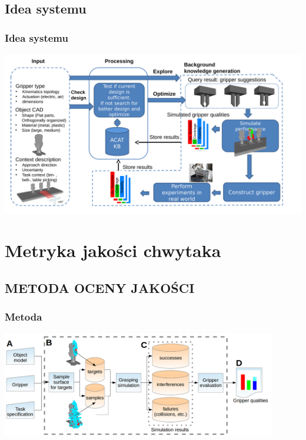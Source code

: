 \documentclass[12pt,a4paper,portrait]{beamer}
\begin{document}
\subsection{Idea systemu}
\begin{frame}
\frametitle{Idea systemu}
\begin{center}
\includegraphics[width=1\textwidth]{images/bigpicture}
\end{center}
\end{frame}


\section{Metryka jakości chwytaka}
\subsection{METODA OCENY JAKOŚCI}
\begin{frame}
\frametitle{Metoda}
\begin{center}
\includegraphics[width=0.9\textwidth]{images/process}
\end{center}
\end{frame}
\end{document}
